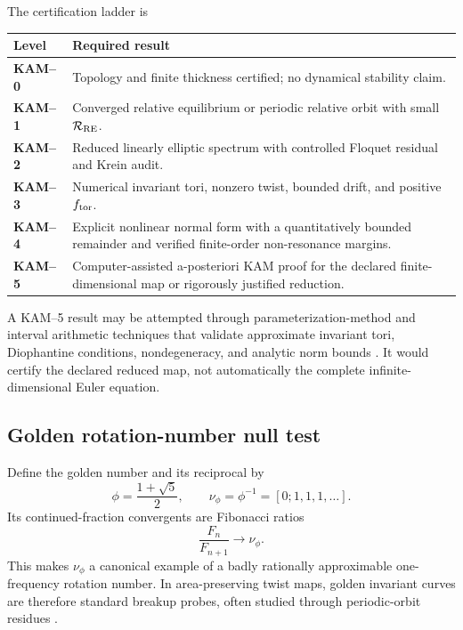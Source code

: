 The certification ladder is
\begin{center}
\begin{tabularx}{0.94\textwidth}{@{}>{\bfseries}p{}X@{}}
\toprule
Level & Required result \\
\midrule
KAM--0 & Topology and finite thickness certified; no dynamical stability claim. \\
KAM--1 & Converged relative equilibrium or periodic relative orbit with small \(\mathcal R_{\rm RE}\). \\
KAM--2 & Reduced linearly elliptic spectrum with controlled Floquet residual and Krein audit. \\
KAM--3 & Numerical invariant tori, nonzero twist, bounded drift, and positive \(f_{\rm tor}\). \\
KAM--4 & Explicit nonlinear normal form with a quantitatively bounded remainder and verified finite-order non-resonance margins. \\
KAM--5 & Computer-assisted a-posteriori KAM proof for the declared finite-dimensional map or rigorously justified reduction. \\
\bottomrule
\end{tabularx}
\end{center}
A KAM--5 result may be attempted through parameterization-method and interval
arithmetic techniques that validate approximate invariant tori, Diophantine
conditions, nondegeneracy, and analytic norm bounds
\cite{FiguerasHaroLuque2017}.  It would certify the declared reduced map, not
automatically the complete infinite-dimensional Euler equation.

\subsection{Golden rotation-number null test}
\label{subsec:rt_kam_golden_rotation_test}

Define the golden number and its reciprocal by
\begin{equation}
    \phi
    =
    \frac{1+\sqrt5}{2},
    \qquad
    \nu_{\phi}
    =
    \phi^{-1}
    =
    [0;1,1,1,\ldots].
    \label{eq:rt_kam_golden_rotation_number}
\end{equation}
Its continued-fraction convergents are Fibonacci ratios
\begin{equation}
    \frac{F_n}{F_{n+1}}
    \longrightarrow
    \nu_{\phi}.
    \label{eq:rt_kam_fibonacci_convergents}
\end{equation}
This makes \(\nu_{\phi}\) a canonical example of a badly rationally
approximable one-frequency rotation number.  In area-preserving twist maps,
golden invariant curves are therefore standard breakup probes, often studied
through periodic-orbit residues \cite{Greene1979StochasticTransition}.

